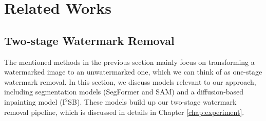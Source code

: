 \chapter{Related Works}
\label{chapter:related-works}
\thispagestyle{empty}


\section{Two-stage Watermark Removal}

The mentioned methods in the previous section mainly focus on transforming a watermarked image to an unwatermarked one, which we can think of as one-stage watermark removal. In this section, we discuss models relevant to our approach, including segmentation models (SegFormer and SAM) and a diffusion-based inpainting model (I$^2$SB). These models build up our two-stage watermark removal pipeline, which is discussed in details in Chapter \ref{chap:experiment}.


